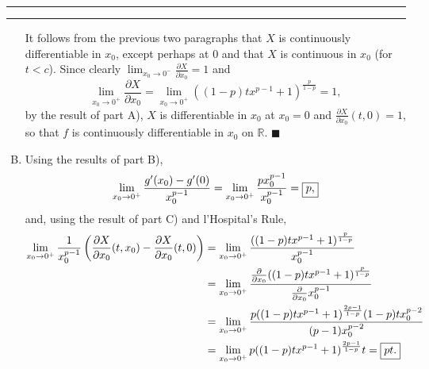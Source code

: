 \documentclass[11pt]{article}
\newcounter{questionCounter}
\newcounter{partCounter}[questionCounter]
\newenvironment{question}[2][\arabic{questionCounter}]{%
    \setcounter{partCounter}{0}%
    \vspace{.25in} \hrule \vspace{0.5em}%
        \noindent{\bf #2}%
    \vspace{0.8em} \hrule \vspace{.10in}%
    \addtocounter{questionCounter}{1}%
}{}
\renewcommand{\qed}{\quad $\blacksquare$}
\newcommand{\R}{\mathbb{R}} %
\begin{document}
\begin{question}{Problem 1}
\begin{enumerate}[A)]
It follows from the previous two paragraphs that $X$ is continuously
differentiable in $x_0$, except perhaps at $0$ and that $X$ is continuous in
$x_0$ (for $t < c$). Since clearly
$\lim_{x_0 \rightarrow 0^-} \frac{\partial X}{\partial x_0} = 1$ and
\[
\lim_{x_0 \rightarrow 0^+} \frac{\partial X}{\partial x_0}
 = \lim_{x_0 \rightarrow 0^+} ((1 - p)tx^{p - 1} + 1)^{\frac{p}{1 - p}}
 = 1,
\]
by the result of part A), $X$ is differentiable in $x_0$ at $x_0 = 0$ and
$\frac{\partial X}{\partial x_0}(t,0) = 1$, so that $f$ is continuously
differentiable in $x_0$ on $\R$. \qed

\item Using the results of part B),
\[
 \lim_{x_0 \rightarrow 0^+} \frac{g'(x_0) - g'(0)}{x_0^{p - 1}}
 = \lim_{x_0 \rightarrow 0^+} \frac{px_0^{p - 1}}{x_0^{p - 1}}
 = \mbox{\fbox{$p$,}}
\]
and, using the result of part C) and l'Hospital's Rule,
\begin{align*}
\lim_{x_0 \rightarrow 0^+} \frac{1}{x_0^{p - 1}}
                    \left( \frac{\partial X}{\partial x_0}(t,x_0)
                            - \frac{\partial X}{\partial x_0}(t,0) \right)
 & = \lim_{x_0 \rightarrow 0^+}
            \frac{((1 - p)tx^{p - 1} + 1)^{\frac{p}{1 - p}}}{x_0^{p - 1}} \\
 & = \lim_{x_0 \rightarrow 0^+}
 \frac{\frac{\partial}{\partial x_0}((1 - p)tx^{p - 1} + 1)^{\frac{p}{1 - p}}}
                                {\frac{\partial}{\partial x_0}x_0^{p - 1}} \\
 & = \lim_{x_0 \rightarrow 0^+}
 \frac{p((1 - p)tx^{p - 1} + 1)^{\frac{2p - 1}{1 - p}}(1 - p)tx_0^{p - 2}}
                                {(p - 1)x_0^{p - 2}} \\
 & = \lim_{x_0 \rightarrow 0^+}
                            p((1 - p)tx^{p - 1} + 1)^{\frac{2p - 1}{1 - p}}t
   = \mbox{\fbox{$pt$.}}
\end{align*}
\end{enumerate}
\end{question}
\end{document}
